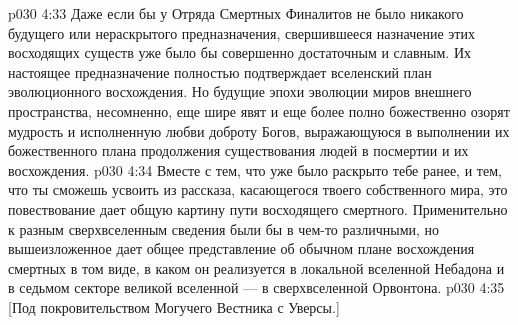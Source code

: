 \vs p030 4:33 Даже если бы у Отряда Смертных Финалитов не было никакого будущего или нераскрытого предназначения, свершившееся назначение этих восходящих существ уже было бы совершенно достаточным и славным. Их настоящее предназначение полностью подтверждает вселенский план эволюционного восхождения. Но будущие эпохи эволюции миров внешнего пространства, несомненно, еще шире явят и еще более полно божественно озорят мудрость и исполненную любви доброту Богов, выражающуюся в выполнении их божественного плана продолжения существования людей в посмертии и их восхождения.
\vs p030 4:34 \pc Вместе с тем, что уже было раскрыто тебе ранее, и тем, что ты сможешь усвоить из рассказа, касающегося твоего собственного мира, это повествование дает общую картину пути восходящего смертного. Применительно к разным сверхвселенным сведения были бы в чем\hyp{}то различными, но вышеизложенное дает общее представление об обычном плане восхождения смертных в том виде, в каком он реализуется в локальной вселенной Небадона и в седьмом секторе великой вселенной --- в сверхвселенной Орвонтона.
\vsetoff
\vs p030 4:35 [Под покровительством Могучего Вестника с Уверсы.]
